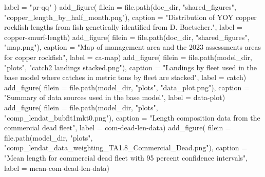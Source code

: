 \documentclass[
  letterpaper,
]{article}
\newenvironment{Shaded}{\begin{snugshade}}{\end{snugshade}}
\newcommand{\AttributeTok}[1]{\textcolor[rgb]{0.77,0.63,0.00}{#1}}
\newcommand{\FunctionTok}[1]{\textcolor[rgb]{0.00,0.00,0.00}{#1}}
\newcommand{\NormalTok}[1]{#1}
\newcommand{\StringTok}[1]{\textcolor[rgb]{0.31,0.60,0.02}{#1}}
\begin{document}
\begin{Shaded}
\begin{Highlighting}[]
  \AttributeTok{label =} \StringTok{"pr{-}qq"}
\NormalTok{)}
\FunctionTok{add\_figure}\NormalTok{(}
\AttributeTok{filein =} \FunctionTok{file.path}\NormalTok{(doc\_dir, }\StringTok{"shared\_figures"}\NormalTok{, }\StringTok{"copper\_length\_by\_half\_month.png"}\NormalTok{), }
\AttributeTok{caption =} \StringTok{"Distribution of YOY copper rockfish lengths from fish genetically identified from D. Baetscher."}\NormalTok{,}
\AttributeTok{label =} \StringTok{\textquotesingle{}copper{-}smurf{-}length\textquotesingle{}}\NormalTok{)}
\FunctionTok{add\_figure}\NormalTok{(}
\AttributeTok{filein =} \FunctionTok{file.path}\NormalTok{(doc\_dir, }\StringTok{"shared\_figures"}\NormalTok{, }\StringTok{"map.png"}\NormalTok{), }
\AttributeTok{caption =} \StringTok{"Map of management area and the 2023 assessments areas for copper rockfish"}\NormalTok{,}
\AttributeTok{label =} \StringTok{\textquotesingle{}ca{-}map\textquotesingle{}}\NormalTok{)}
\FunctionTok{add\_figure}\NormalTok{(}
\AttributeTok{filein =} \FunctionTok{file.path}\NormalTok{(model\_dir, }\StringTok{"plots"}\NormalTok{, }\StringTok{"catch2 landings stacked.png"}\NormalTok{), }
\AttributeTok{caption =} \StringTok{"Landings by fleet used in the base model where catches in metric tons by fleet are stacked"}\NormalTok{,}
\AttributeTok{label =} \StringTok{\textquotesingle{}catch\textquotesingle{}}\NormalTok{)}
\FunctionTok{add\_figure}\NormalTok{(}
\AttributeTok{filein =} \FunctionTok{file.path}\NormalTok{(model\_dir, }\StringTok{"plots"}\NormalTok{, }\StringTok{"data\_plot.png"}\NormalTok{), }
\AttributeTok{caption =} \StringTok{"Summary of data sources used in the base model"}\NormalTok{,}
\AttributeTok{label =} \StringTok{\textquotesingle{}data{-}plot\textquotesingle{}}\NormalTok{)}
\FunctionTok{add\_figure}\NormalTok{(}
\AttributeTok{filein =} \FunctionTok{file.path}\NormalTok{(model\_dir, }\StringTok{"plots"}\NormalTok{, }\StringTok{"comp\_lendat\_bubflt1mkt0.png"}\NormalTok{), }
\AttributeTok{caption =} \StringTok{"Length composition data from the commercial dead fleet"}\NormalTok{,}
\AttributeTok{label =} \StringTok{\textquotesingle{}com{-}dead{-}len{-}data\textquotesingle{}}\NormalTok{)}
\FunctionTok{add\_figure}\NormalTok{(}
\AttributeTok{filein =} \FunctionTok{file.path}\NormalTok{(model\_dir, }\StringTok{"plots"}\NormalTok{, }\StringTok{"comp\_lendat\_data\_weighting\_TA1.8\_Commercial\_Dead.png"}\NormalTok{), }
\AttributeTok{caption =} \StringTok{"Mean length for commercial dead fleet with 95 percent confidence intervals"}\NormalTok{,}
\AttributeTok{label =} \StringTok{\textquotesingle{}mean{-}com{-}dead{-}len{-}data\textquotesingle{}}\NormalTok{)}

\end{Highlighting}
\end{Shaded}
\end{document}
